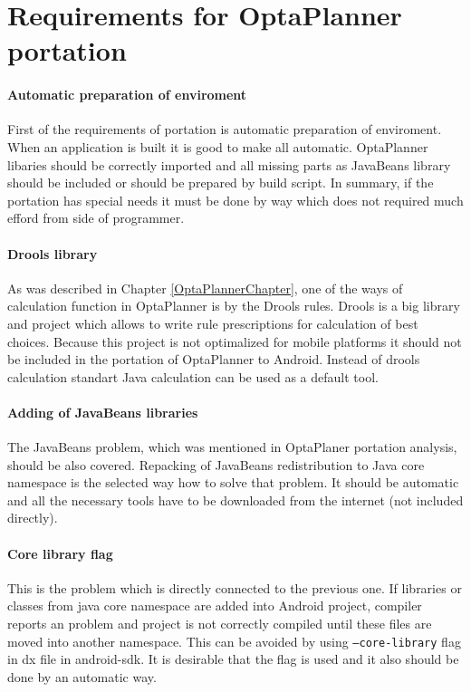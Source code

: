 \section{Requirements for OptaPlanner portation}

\paragraph{Automatic preparation of enviroment}
First of the requirements of portation is automatic preparation of enviroment. When an application is built it is good
to make all automatic. OptaPlanner libaries should be correctly imported and all missing parts as JavaBeans library
should be included or should be prepared by build script. In summary, if the portation has special needs it must be done
by way which does not required much efford from side of programmer.

\paragraph{Drools library}
As was described in Chapter \ref{OptaPlannerChapter}, one of the ways of calculation function in OptaPlanner is by the
Drools rules. Drools is a big library and project which allows to write rule prescriptions for calculation of best
choices. Because this project is not optimalized for mobile platforms it should not be included in the portation of
OptaPlanner to Android. Instead of drools calculation standart Java calculation can be used as a default tool.

\paragraph{Adding of JavaBeans libraries}
The JavaBeans problem, which was mentioned in OptaPlaner portation analysis, should be also covered. Repacking of
JavaBeans redistribution to Java core namespace is the selected way how to solve that problem. It should be automatic
and all the necessary tools have to be downloaded from the internet (not included directly).

\paragraph{Core library flag}
This is the problem which is directly connected to the previous one. If libraries or classes from java core namespace
are added into Android project, compiler reports an problem and project is not correctly compiled until these files are
moved into another namespace. This can be avoided by using \texttt{--core-library} flag in dx file in android-sdk.
It is desirable that the flag is used and it also should be done by an automatic way.

